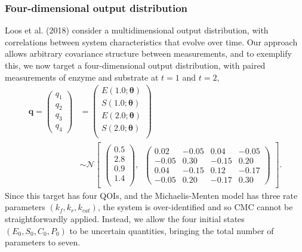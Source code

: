 \subsubsection{Four-dimensional output distribution}
Loos et al. (2018) consider a multidimensional output distribution, with correlations between system characteristics that evolve over time. Our approach allows arbitrary covariance structure between measurements, and to exemplify this, we now target a four-dimensional output distribution, with paired measurements of enzyme and substrate at $t=1$ and $t=2$,
%
\begin{equation}\label{eq:MM_4d_output}
\begin{aligned}
\boldsymbol{q} = \begin{pmatrix} q_1 \\ q_2 \\ q_3 \\ q_4 \end{pmatrix} &=
\begin{pmatrix}
E(1.0; \boldsymbol{\theta})\\
S(1.0; \boldsymbol{\theta})\\
E(2.0; \boldsymbol{\theta})\\
S(2.0; \boldsymbol{\theta})\\
\end{pmatrix}
\\
&\sim  \mathcal{N}
\begin{bmatrix}
\begin{pmatrix}
0.5\\
2.8\\
0.9\\
1.4\\
\end{pmatrix}, \;\;
\begin{pmatrix}
0.02 &  -0.05 &  0.04 & -0.05\\
-0.05 & 0.30  & -0.15 & 0.20\\
0.04 & -0.15  & 0.12  &  -0.17\\
-0.05 & 0.20 & -0.17 & 0.30
\end{pmatrix}
\end{bmatrix}.
\end{aligned}
\end{equation}
%
Since this target has four QOIs, and the Michaelis-Menten model has three rate parameters $(k_f,k_r,k_{cat})$, the system is over-identified and so CMC cannot be straightforwardly applied. Instead, we allow the four initial states $(E_0, S_0, C_0, P_0)$ to be uncertain quantities, bringing the total number of parameters to seven.%
